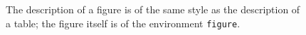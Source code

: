 \documentclass{poster15}
\begin{document}
%
\begin{figure}[ht!]
\begin{center}
%
\caption{The description of a figure is of the same style as the description of a table; the figure itself is of the environment \texttt{figure}.
} 
\label{fig1}
\end{center}
\end{figure}%
%
%
%
\end{document}
